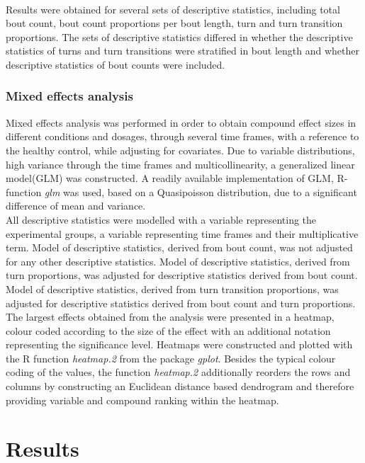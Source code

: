 \documentclass[a4paper,12pt]{article}
\begin{document}
\\Results were obtained for several sets of descriptive statistics, including total bout count, bout count proportions per bout length, turn and turn transition proportions. The sets of descriptive statistics differed in whether the descriptive statistics of turns and turn transitions were stratified in bout length and whether descriptive statistics of bout counts were included. 
\subsubsection{Mixed effects analysis}
Mixed effects analysis was performed in order to obtain compound effect sizes in different conditions and dosages, through several time frames, with a reference to the healthy control, while adjusting for covariates. Due to variable distributions, high variance through the time frames and multicollinearity, a generalized linear model(GLM) was constructed. A readily available implementation of GLM, R-function \textit{glm} was used, based on a Quasipoisson distribution, due to a significant difference of mean and variance. \\All descriptive statistics were modelled with a variable representing the experimental groups, a variable representing time frames and their multiplicative term. Model of descriptive statistics, derived from bout count, was not adjusted for any other descriptive statistics. Model of descriptive statistics, derived from turn proportions, was adjusted for descriptive statistics derived from bout count. Model of descriptive statistics, derived from turn transition proportions, was adjusted for descriptive statistics derived from bout count and turn proportions. 
\\The largest effects obtained from the analysis were presented in a heatmap, colour coded according to the size of the effect with an additional notation representing the significance level. Heatmaps were constructed and plotted with the R function \textit{heatmap.2} from the package \textit{gplot}\cite{ref40}. Besides the typical colour coding of the values, the function \textit{heatmap.2} additionally reorders the rows and columns by constructing an Euclidean distance based dendrogram and therefore providing variable and compound ranking within the heatmap.
\section{Results}
\end{document}
